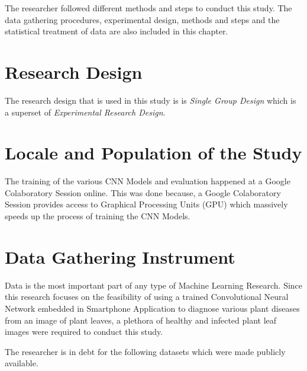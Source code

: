 

The researcher followed different methods and 
steps to conduct this study. The data gathering
procedures, experimental design, methods and steps 
and the statistical treatment of data are also 
included in this chapter.

\section{Research Design}
The research design that is used in this study is 
is \emph{Single Group Design} which is a superset 
of \emph{Experimental Research Design}.

\section{Locale and Population of the Study}
The training of the various CNN Models and evaluation happened 
at a Google Colaboratory Session online. This was done because, 
a Google Colaboratory Session provides access to Graphical Processing 
Units (GPU) which massively speeds up the process of training the CNN Models.

\section{Data Gathering Instrument}
Data is the most important part of any type of Machine Learning Research. 
Since this research focuses on the feasibility of using a trained 
Convolutional Neural Network embedded in Smartphone Application to diagnose 
various plant diseases from an image of plant leaves, a plethora of 
healthy and infected plant leaf images were required to conduct this study. 

The researcher is in debt for the following datasets which were made publicly 
available. 

